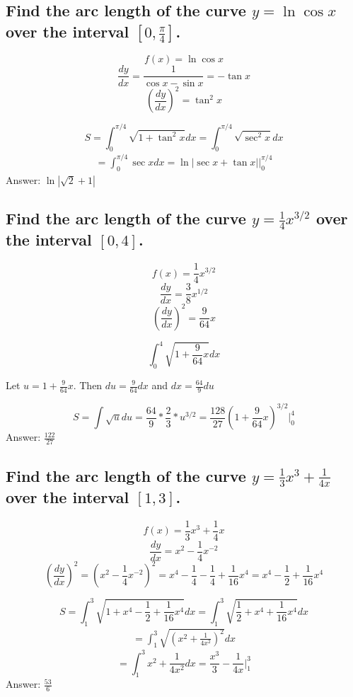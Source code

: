 \documentclass{article}
\begin{document}
\subsection{Find the arc length of the curve $y = \ln{\cos{x}}$ over the interval $[0, \frac{\pi}{4}]$.}

\[f(x) = \ln{\cos{x}}\]
\[\frac{dy}{dx} = \frac{1}{\cos{x}-\sin{x}} = -\tan{x}\]
\[(\frac{dy}{dx})^2 = \tan^2{x}\]

\bigskip

\[S = \int_0^{\pi/4} \sqrt{1+\tan^2{x}}dx = \int_0^{\pi/4} \sqrt{\sec^2{x}}dx  \]
\begin{align*}
	= \int_0^{\pi/4} \sec{x}dx = \ln{|\sec{x}+\tan{x}|} \Big|_{0}^{\pi/4}
\end{align*}
Answer: $\ln{|\sqrt{2} +1|}$

\subsection{Find the arc length of the curve $y = \frac{1}{4}x^{3/2}$ over the interval $[0, 4]$.}

\[f(x) = \frac{1}{4} x^{3/2}\]
\[\frac{dy}{dx} = \frac{3}{8}x^{1/2}\]
\[(\frac{dy}{dx})^2 = \frac{9}{64}x\]

\bigskip

\[\int_0^4 \sqrt{1+ \frac{9}{64}x} dx\]

Let $u = 1+\frac{9}{64}x$. Then $du = \frac{9}{64}dx$ and $dx = \frac{64}{9} du$

\[S = \int \sqrt{u} du = \frac{64}{9} * \frac{2}{3} * u^{3/2} = \frac{128}{27}(1+\frac{9}{64}x)^{3/2} \Big|_{0}^{4}\]
Answer: $\frac{122}{27}$


\subsection{Find the arc length of the curve $y = \frac{1}{3}x^3 + \frac{1}{4x}$ over the interval $[1, 3]$.}

\[f(x) = \frac{1}{3} x^3+\frac{1}{4} x\]
\[\frac{dy}{dx} = x^2 - \frac{1}{4}x^{-2}\]
\[(\frac{dy}{dx})^2 = (x^2 - \frac{1}{4}x^{-2})^2 = x^4 -\frac{1}{4} - \frac{1}{4} +\frac{1}{16}x^4 = x^4 -\frac{1}{2} +\frac{1}{16}x^4\]

\bigskip

\[ S = \int_1^3 \sqrt{1 +x^4 -\frac{1}{2} +\frac{1}{16}x^4}dx = \int_1^3 \sqrt{\frac{1}{2} +x^4  +\frac{1}{16}x^4}dx \]
\begin{align*}
	= \int_1^3 \sqrt{(x^2+\frac{1}{4x^2})^2}dx 
\end{align*}
\[= \int_1^3 x^2+\frac{1}{4x^2}dx  = \frac{x^3}{3} - \frac{1}{4x} \Big|_{1}^{3}\]
Answer: $\frac{53}{6}$
\end{document}
